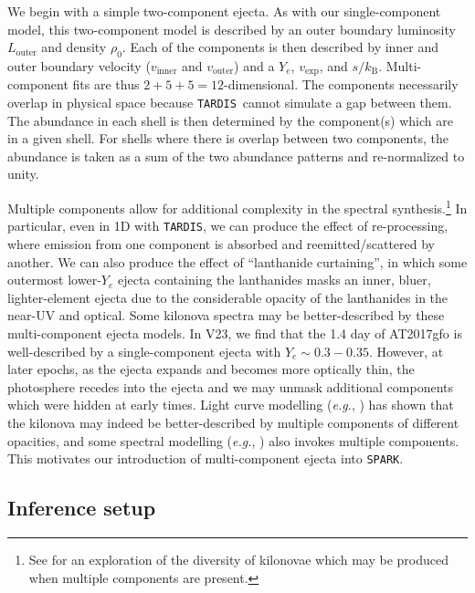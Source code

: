 \documentclass[twocolumn,twocolappendix]{aastex63}
\def\SPARK{\texttt{SPARK}}
\def\TARDIS{\texttt{TARDIS}}
\def\eg{{\it e.g.}}
\begin{document}
We begin with a simple two-component ejecta. As with our single-component model, this two-component model is described by an outer boundary luminosity $L_{\mathrm{outer}}$ and density $\rho_0$. Each of the components is then described by inner and outer boundary velocity ($v_{\mathrm{inner}}$ and $v_{\mathrm{outer}}$) and a $Y_e$, $v_{\mathrm{exp}}$, and $s / k_{\mathrm{B}}$. Multi-component fits are thus $2 + 5 + 5 = 12$-dimensional. The components necessarily overlap in physical space because \TARDIS~cannot simulate a gap between them. The abundance in each shell is then determined by the component(s) which are in a given shell. For shells where there is overlap between two components, the abundance is taken as a sum of the two abundance patterns and re-normalized to unity. %
    
Multiple components allow for additional complexity in the spectral synthesis.\footnote{See \cite{kawaguchi20} for an exploration of the diversity of kilonovae which may be produced when multiple components are present.} In particular, even in 1D with \TARDIS, we can produce the effect of re-processing, where emission from one component is absorbed and reemitted/scattered by another. We can also produce the effect of ``lanthanide curtaining'', in which some outermost lower-$Y_e$ ejecta containing the lanthanides masks an inner, bluer, lighter-element ejecta due to the considerable opacity of the lanthanides in the near-UV and optical. Some kilonova spectra may be better-described by these multi-component ejecta models. In V23, we find that the 1.4 day of AT2017gfo is well-described by a single-component ejecta with $Y_e \sim 0.3-0.35$. However, at later epochs, as the ejecta expands and becomes more optically thin, the photosphere recedes into the ejecta and we may unmask additional components which were hidden at early times. Light curve modelling (\eg, \citealt{villar17}) has shown that the kilonova may indeed be better-described by multiple components of different opacities, and some spectral modelling (\eg, \citealt{kasen17}) also invokes multiple components. This motivates our introduction of multi-component ejecta into \SPARK.




\subsection{Inference setup}\label{ssc:inference-setup}
\end{document}
